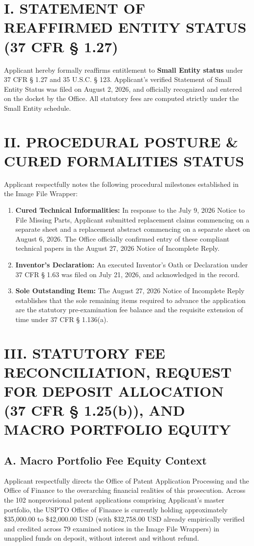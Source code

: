 \documentclass[11pt,letterpaper]{article}
\begin{document}
\section*{I. STATEMENT OF REAFFIRMED ENTITY STATUS (37 CFR \S{} 1.27)}

Applicant hereby formally reaffirms entitlement to \textbf{Small Entity status} under 37 CFR \S{} 1.27 and 35 U.S.C. \S{} 123. Applicant's verified Statement of Small Entity Status was filed on August 2, 2026, and officially recognized and entered on the docket by the Office. All statutory fees are computed strictly under the Small Entity schedule.

\section*{II. PROCEDURAL POSTURE \& CURED FORMALITIES STATUS}

Applicant respectfully notes the following procedural milestones established in the Image File Wrapper:
\begin{enumerate}[leftmargin=*]
    \item \textbf{Cured Technical Informalities:} In response to the July 9, 2026 Notice to File Missing Parts, Applicant submitted replacement claims commencing on a separate sheet and a replacement abstract commencing on a separate sheet on August 6, 2026. The Office officially confirmed entry of these compliant technical papers in the August 27, 2026 Notice of Incomplete Reply.
    \item \textbf{Inventor's Declaration:} An executed Inventor's Oath or Declaration under 37 CFR \S{} 1.63 was filed on July 21, 2026, and acknowledged in the record.
    \item \textbf{Sole Outstanding Item:} The August 27, 2026 Notice of Incomplete Reply establishes that the sole remaining items required to advance the application are the statutory pre-examination fee balance and the requisite extension of time under 37 CFR \S{} 1.136(a).
\end{enumerate}

\section*{III. STATUTORY FEE RECONCILIATION, REQUEST FOR DEPOSIT ALLOCATION (37 CFR \S{} 1.25(b)), AND MACRO PORTFOLIO EQUITY}

\subsection*{A. Macro Portfolio Fee Equity Context}
Applicant respectfully directs the Office of Patent Application Processing and the Office of Finance to the overarching financial realities of this prosecution. Across the 102 nonprovisional patent applications comprising Applicant's master portfolio, the USPTO Office of Finance is currently holding approximately \$35,000.00 to \$42,000.00 USD (with \$32,758.00 USD already empirically verified and credited across 79 examined notices in the Image File Wrappers) in unapplied funds on deposit, without interest and without refund.
\end{document}
